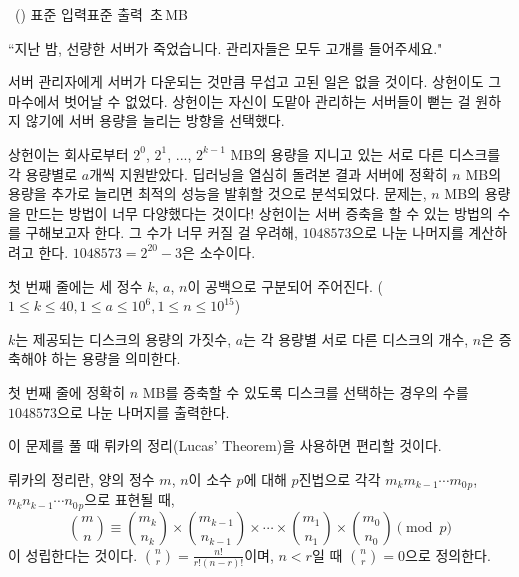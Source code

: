 \begin{problem}{\kcpcprobserver\ (\kcpcprobservershort)}
    {표준 입력}{표준 출력}
    {\kcpcprobservertime\,초}{\kcpcprobservermemory\,MB}{}
    
    ``지난 밤, 선량한 서버가 죽었습니다. 관리자들은 모두 고개를 들어주세요."
    
    서버 관리자에게 서버가 다운되는 것만큼 무섭고 고된 일은 없을 것이다. 상헌이도 그 마수에서 벗어날 수 없었다. 상헌이는 자신이 도맡아 관리하는 서버들이 뻗는 걸 원하지 않기에 서버 용량을 늘리는 방향을 선택했다.
    
    상헌이는 회사로부터 $2^0$, $2^1$, ..., $2^{k-1}$ MB의 용량을 지니고 있는 서로 다른 디스크를 각 용량별로 $a$개씩 지원받았다. 딥러닝을 열심히 돌려본 결과 서버에 정확히 $n$ MB의 용량을 추가로 늘리면 최적의 성능을 발휘할 것으로 분석되었다. 문제는, $n$ MB의 용량을 만드는 방법이 너무 다양했다는 것이다! 상헌이는 서버 증축을 할 수 있는 방법의 수를 구해보고자 한다. 그 수가 너무 커질 걸 우려해, $1048573$으로 나눈 나머지를 계산하려고 한다. 
    $1048573 = 2^{20} - 3$은 소수이다.
    
    \InputFile
    첫 번째 줄에는 세 정수 $k$, $a$, $n$이 공백으로 구분되어 주어진다. ($1 \leq k \leq 40, 1 \leq a \leq 10^6, 1 \leq n \leq 10^{15}$)
    
    $k$는 제공되는 디스크의 용량의 가짓수, $a$는 각 용량별 서로 다른 디스크의 개수, $n$은 증축해야 하는 용량을 의미한다.
    
    \OutputFile
    첫 번째 줄에 정확히 $n$ MB를 증축할 수 있도록 디스크를 선택하는 경우의 수를 $1048573$으로 나눈 나머지를 출력한다.
    
    \Examples
    \begin{example}
    \end{example}
    
    \Note
    이 문제를 풀 때 뤼카의 정리(Lucas' Theorem)을 사용하면 편리할 것이다. 
    
    뤼카의 정리란, 양의 정수 $m$, $n$이 소수 $p$에 대해 $p$진법으로 각각 $m_{k}m_{k-1}\cdots m_{0}{_{p}}$, $n_{k}n_{k-1}\cdots n_{0}{_{p}}$으로 표현될 때,
    $$
    \binom{m}{n} \equiv \binom{m_k}{n_k} \times \binom{m_{k-1}}{n_{k-1}} \times \cdots \times \binom{m_1}{n_1} \times \binom{m_0}{n_0} \pmod p
    $$
    이 성립한다는 것이다. $\binom{n}{r} = \frac{n!}{r!(n-r)!}$이며, $n < r$일 때 $\binom{n}{r} = 0$으로 정의한다.
    

\end{problem}
